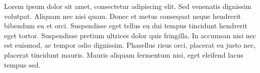 \documentclass{timmbrief}
\begin{document}
\begin{letter}

Lorem ipsum dolor sit amet, consectetur adipiscing elit. Sed venenatis dignissim volutpat. Aliquam nec nisi quam. Donec et metus consequat neque hendrerit bibendum eu et orci. Suspendisse eget tellus eu dui tempus tincidunt hendrerit eget tortor. Suspendisse pretium ultrices dolor quis fringilla. In accumsan nisi nec est euismod, ac tempor odio dignissim. Phasellus risus orci, placerat eu justo nec, placerat tincidunt mauris. Mauris aliquam fermentum nisi, eget eleifend lacus tempus sed.
\end{letter}


\end{document}
